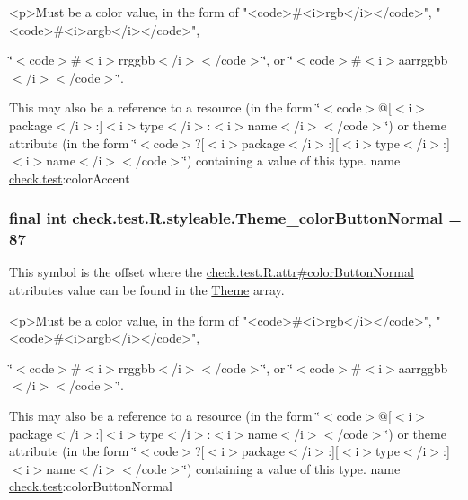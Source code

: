 \begin{DoxyVerb}      <p>Must be a color value, in the form of "<code>#<i>rgb</i></code>", "<code>#<i>argb</i></code>",
\end{DoxyVerb}
 \char`\"{}$<$code$>$\#$<$i$>$rrggbb$<$/i$>$$<$/code$>$\char`\"{}, or \char`\"{}$<$code$>$\#$<$i$>$aarrggbb$<$/i$>$$<$/code$>$\char`\"{}. 

This may also be a reference to a resource (in the form \char`\"{}$<$code$>$@\mbox{[}$<$i$>$package$<$/i$>$\+:\mbox{]}$<$i$>$type$<$/i$>$\+:$<$i$>$name$<$/i$>$$<$/code$>$\char`\"{}) or theme attribute (in the form \char`\"{}$<$code$>$?\mbox{[}$<$i$>$package$<$/i$>$\+:\mbox{]}\mbox{[}$<$i$>$type$<$/i$>$\+:\mbox{]}$<$i$>$name$<$/i$>$$<$/code$>$\char`\"{}) containing a value of this type.  name \hyperlink{namespacecheck_1_1test}{check.\+test}\+:color\+Accent \hypertarget{classcheck_1_1test_1_1_r_1_1styleable_a3cf28f21d7d92dd03cab898e43cd3cf9}{}
\subsubsection[{Theme\+\_\+color\+Button\+Normal}]{\setlength{\rightskip}{0pt plus 5cm}final int check.\+test.\+R.\+styleable.\+Theme\+\_\+color\+Button\+Normal = 87\hspace{0.3cm}{\ttfamily [static]}}\label{classcheck_1_1test_1_1_r_1_1styleable_a3cf28f21d7d92dd03cab898e43cd3cf9}
This symbol is the offset where the \hyperlink{classcheck_1_1test_1_1_r_1_1attr_abef35f07161bdd7ae466dc158b37e59b}{check.\+test.\+R.\+attr\#color\+Button\+Normal} attribute\textquotesingle{}s value can be found in the \hyperlink{classcheck_1_1test_1_1_r_1_1styleable_acca726d02016a0cf607782ec3a436a81}{Theme} array.

\begin{DoxyVerb}      <p>Must be a color value, in the form of "<code>#<i>rgb</i></code>", "<code>#<i>argb</i></code>",
\end{DoxyVerb}
 \char`\"{}$<$code$>$\#$<$i$>$rrggbb$<$/i$>$$<$/code$>$\char`\"{}, or \char`\"{}$<$code$>$\#$<$i$>$aarrggbb$<$/i$>$$<$/code$>$\char`\"{}. 

This may also be a reference to a resource (in the form \char`\"{}$<$code$>$@\mbox{[}$<$i$>$package$<$/i$>$\+:\mbox{]}$<$i$>$type$<$/i$>$\+:$<$i$>$name$<$/i$>$$<$/code$>$\char`\"{}) or theme attribute (in the form \char`\"{}$<$code$>$?\mbox{[}$<$i$>$package$<$/i$>$\+:\mbox{]}\mbox{[}$<$i$>$type$<$/i$>$\+:\mbox{]}$<$i$>$name$<$/i$>$$<$/code$>$\char`\"{}) containing a value of this type.  name \hyperlink{namespacecheck_1_1test}{check.\+test}\+:color\+Button\+Normal \hypertarget{classcheck_1_1test_1_1_r_1_1styleable_a1d6c74771db390d0820612ca1d065c4d}{}
